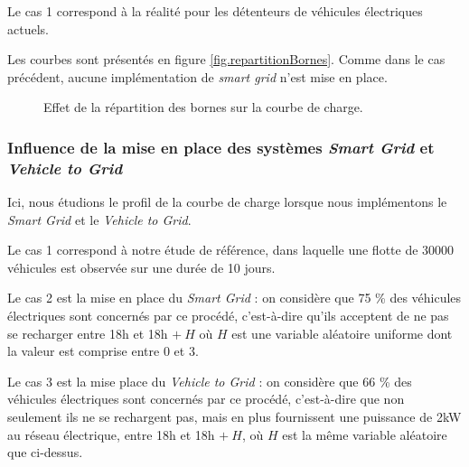 				Le cas 1 correspond à la réalité pour les détenteurs de véhicules électriques actuels.
				
				Les courbes sont présentés en figure \vref{fig.repartitionBornes}. Comme dans le cas précédent, aucune implémentation de \emph{smart grid} n'est mise en place.
				
				\begin{figure}[!h]
					\centering
					\caption{Effet de la répartition des bornes sur la courbe de charge. \label{fig.repartitionBornes}}
				\end{figure}
				
				
				
				\subsubsection{Influence de la mise en place des systèmes \emph{Smart Grid} et \emph{Vehicle to Grid}}
				
				Ici, nous étudions le profil de la courbe de charge lorsque nous implémentons le \emph{Smart Grid} et le \emph{Vehicle to Grid}.
				
				Le cas 1 correspond à notre étude de référence, dans laquelle une flotte de 30000 véhicules est observée sur une durée de 10 jours.
				
				Le cas 2 est la mise en place du \emph{Smart Grid} : on considère que 75 \% des véhicules électriques sont concernés par ce procédé, c'est-à-dire qu'ils acceptent de ne pas se recharger entre 18h et 18h $+\ H$ où $H$ est une variable aléatoire uniforme dont la valeur est comprise entre 0 et 3.
				
				Le cas 3 est la mise place du \emph{Vehicle to Grid} : on considère que 66 \% des véhicules électriques sont concernés par ce procédé, c'est-à-dire que non seulement ils ne se rechargent pas, mais en plus fournissent une puissance de 2kW au réseau électrique, entre 18h et 18h $+\ H$, où $H$ est la même variable aléatoire que ci-dessus.
				
